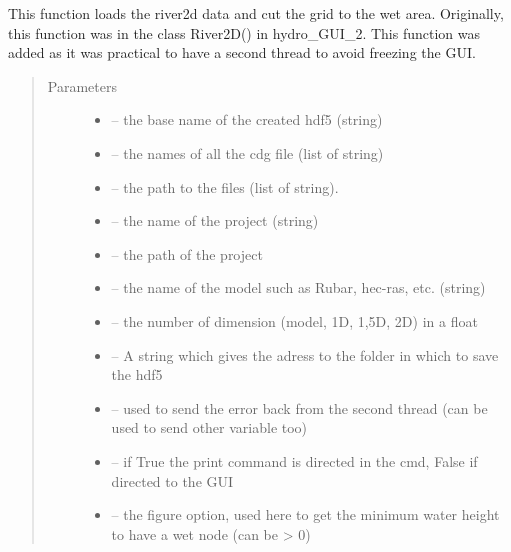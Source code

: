 \documentclass[letterpaper,10pt,english]{sphinxmanual}
\begin{document}
\begin{fulllineitems}
\label{\detokenize{index:src.river2d.load_river2d_and_cut_grid}}
This function loads the river2d data and cut the grid to the wet area. Originally, this function was in the class
River2D() in hydro\_GUI\_2. This function was added as it was practical to have a second thread to avoid freezing
the GUI.
\begin{quote}\begin{description}
\item[{Parameters}] \leavevmode\begin{itemize}
\item {} 
 -- the base name of the created hdf5 (string)

\item {} 
 -- the names of all the cdg file (list of string)

\item {} 
 -- the path to the files (list of string).

\item {} 
 -- the name of the project (string)

\item {} 
 -- the path of the project

\item {} 
 -- the name of the model such as Rubar, hec-ras, etc. (string)

\item {} 
 -- the number of dimension (model, 1D, 1,5D, 2D) in a float

\item {} 
 -- A string which gives the adress to the folder in which to save the hdf5

\item {} 
 -- used to send the error back from the second thread (can be used to send other variable too)

\item {} 
 -- if True the print command is directed in the cmd, False if directed to the GUI

\item {} 
 -- the figure option, used here to get the minimum water height to have a wet node (can be \textgreater{} 0)

\end{itemize}

\end{description}\end{quote}

\end{fulllineitems}
\end{document}
